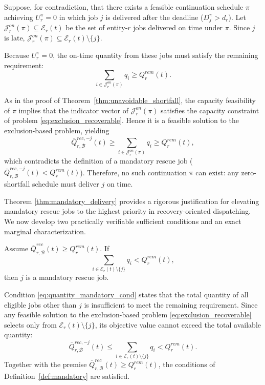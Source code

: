 \begin{pf}
Suppose, for contradiction, that there exists a feasible continuation schedule $\pi$ achieving $U_r^\pi=0$ in which job $j$ is delivered after the deadline ($D_j^\pi>d_r$). Let $\mathcal J_{r}^{on}(\pi)\subseteq\mathcal E_r(t)$ be the set of entity-$r$ jobs delivered on time under $\pi$. Since $j$ is late, $\mathcal J_{r}^{on}(\pi)\subseteq\mathcal E_r(t)\setminus\{j\}$.

Because $U_r^\pi=0$, the on-time quantity from these jobs must satisfy the remaining requirement:
\[
\sum_{i\in\mathcal J_{r}^{on}(\pi)}q_i\ge Q_r^{rem}(t).
\]

As in the proof of Theorem~\ref{thm:unavoidable_shortfall}, the capacity feasibility of $\pi$ implies that the indicator vector of $\mathcal J_{r}^{on}(\pi)$ satisfies the capacity constraint of problem \eqref{eq:exclusion_recoverable}. Hence it is a feasible solution to the exclusion-based problem, yielding
\[
\overline Q_{r,\mathcal B}^{rec,-j}(t)\ge\sum_{i\in\mathcal J_{r}^{on}(\pi)}q_i\ge Q_r^{rem}(t),
\]
which contradicts the definition of a mandatory rescue job ($\overline Q_{r,\mathcal B}^{rec,-j}(t)<Q_r^{rem}(t)$). Therefore, no such continuation $\pi$ can exist: any zero-shortfall schedule must deliver $j$ on time.
\end{pf}

Theorem \ref{thm:mandatory_delivery} provides a rigorous justification for elevating mandatory rescue jobs to the highest priority in recovery-oriented dispatching. We now develop two practically verifiable sufficient conditions and an exact marginal characterization.

\begin{proposition}\label{prop:quantity_mandatory}
Assume $\overline Q_{r,\mathcal B}^{rec}(t)\ge Q_r^{rem}(t)$. If
\begin{equation}\label{eq:quantity_mandatory_cond}
\sum_{i\in\mathcal E_r(t)\setminus\{j\}}q_i<Q_r^{rem}(t),
\end{equation}
then $j$ is a mandatory rescue job.
\end{proposition}

\begin{pf}
Condition \eqref{eq:quantity_mandatory_cond} states that the total quantity of all eligible jobs other than $j$ is insufficient to meet the remaining requirement. Since any feasible solution to the exclusion-based problem \eqref{eq:exclusion_recoverable} selects only from $\mathcal E_r(t)\setminus\{j\}$, its objective value cannot exceed the total available quantity:
\[
\overline Q_{r,\mathcal B}^{rec,-j}(t)\le\sum_{i\in\mathcal E_r(t)\setminus\{j\}}q_i<Q_r^{rem}(t).
\]
Together with the premise $\overline Q_{r,\mathcal B}^{rec}(t)\ge Q_r^{rem}(t)$, the conditions of Definition~\ref{def:mandatory} are satisfied.
\end{pf}

